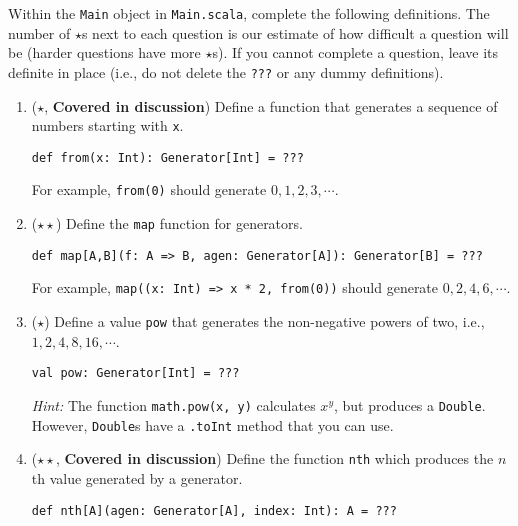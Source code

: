 \documentclass[9pt]{extbook}
\begin{document}
Within the \lstinline|Main| object in \lstinline|Main.scala|, complete
the following definitions. The number of $\star$s next to each question is
our estimate of how difficult a question will be (harder questions have more 
$\star$s). If you cannot complete a question, leave its definite in place
(i.e., do not delete the \lstinline|???| or any dummy definitions).

\begin{enumerate}

  \item ($\star$, \textbf{Covered in discussion}) Define a function that 
  generates a sequence of numbers starting with \lstinline|x|.

\begin{lstlisting}
def from(x: Int): Generator[Int] = ???
\end{lstlisting}
  
   For example, \lstinline|from(0)| should generate $0, 1, 2, 3, \cdots$.

  \item ($\star\star$) Define the \lstinline|map| function for generators.

\begin{lstlisting}
def map[A,B](f: A => B, agen: Generator[A]): Generator[B] = ???
\end{lstlisting}

  For example, \lstinline|map((x: Int) => x * 2, from(0))| should generate
  $0, 2, 4, 6, \cdots$.


  \item ($\star$) Define a value \lstinline|pow| that generates
  the non-negative powers of two, i.e., $1, 2, 4, 8, 16, \cdots$.

\begin{lstlisting}
val pow: Generator[Int] = ???
\end{lstlisting}

  \emph{Hint:} The function \lstinline|math.pow(x, y)| calculates $x^y$, but
  produces a \lstinline|Double|.
  However, \lstinline|Double|s have a \lstinline|.toInt| method that you can
  use.

\item ($\star\star$, \textbf{Covered in discussion}) Define the function
  \lstinline|nth| which produces the $n$th value generated by a generator.

\begin{lstlisting}
def nth[A](agen: Generator[A], index: Int): A = ???
\end{lstlisting}
  

\end{enumerate}
\end{document}
